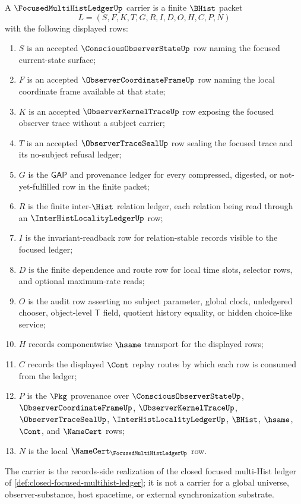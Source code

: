 \begin{definition}
\label{def:focused-multi-hist-ledger-carrier}
A $\FocusedMultiHistLedgerUp$ carrier is a finite $\BHist$ packet
$$
L=(S,F,K,T,G,R,I,D,O,H,C,P,N)
$$
with the following displayed rows:
\begin{enumerate}
\item $S$ is an accepted $\ConsciousObserverStateUp$ row naming the focused current-state surface;
\item $F$ is an accepted $\ObserverCoordinateFrameUp$ row naming the local coordinate frame available at that state;
\item $K$ is an accepted $\ObserverKernelTraceUp$ row exposing the focused observer trace without a subject carrier;
\item $T$ is an accepted $\ObserverTraceSealUp$ row sealing the focused trace and its no-subject refusal ledger;
\item $G$ is the $\mathsf{GAP}$ and provenance ledger for every compressed, digested, or not-yet-fulfilled row in the finite packet;
\item $R$ is the finite inter-$\Hist$ relation ledger, each relation being read through an $\InterHistLocalityLedgerUp$ row;
\item $I$ is the invariant-readback row for relation-stable records visible to the focused ledger;
\item $D$ is the finite dependence and route row for local time slots, selector rows, and optional maximum-rate reads;
\item $O$ is the audit row asserting no subject parameter, global clock, unledgered chooser, object-level $\mathsf{T}$ field, quotient history equality, or hidden choice-like service;
\item $H$ records componentwise $\hsame$ transport for the displayed rows;
\item $C$ records the displayed $\Cont$ replay routes by which each row is consumed from the ledger;
\item $P$ is the $\Pkg$ provenance over $\ConsciousObserverStateUp$, $\ObserverCoordinateFrameUp$, $\ObserverKernelTraceUp$, $\ObserverTraceSealUp$, $\InterHistLocalityLedgerUp$, $\BHist$, $\hsame$, $\Cont$, and $\NameCert$ rows;
\item $N$ is the local $\NameCert_{\FocusedMultiHistLedgerUp}$ row.
\end{enumerate}
The carrier is the records-side realization of the closed focused multi-Hist ledger of \autoref{def:closed-focused-multihist-ledger}; it is not a carrier for a global universe, observer-substance, host spacetime, or external synchronization substrate.
\end{definition}

